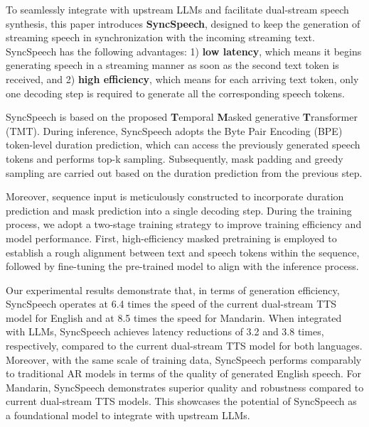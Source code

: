 To seamlessly integrate with  upstream LLMs and facilitate dual-stream speech synthesis, this paper introduces \textbf{SyncSpeech}, designed to keep the generation of streaming speech in synchronization with the incoming streaming text. SyncSpeech has the following advantages: 1) \textbf{low latency}, which means it begins generating speech in a streaming manner as soon as the second text token is received,
and
2) \textbf{high efficiency}, 
which means for each arriving text token, only one decoding step is required to generate all the corresponding speech tokens.

SyncSpeech is based on the proposed \textbf{T}emporal \textbf{M}asked generative \textbf{T}ransformer (TMT).
During inference, SyncSpeech adopts the Byte Pair Encoding (BPE) token-level duration prediction, which can access the previously generated speech tokens and performs top-k sampling. 
Subsequently, mask padding and greedy sampling are carried out based on  the duration prediction from the previous step. 

Moreover, sequence input is meticulously constructed to incorporate duration prediction and mask prediction into a single decoding step.
During the training process, we adopt a two-stage training strategy to improve training efficiency and model performance. First, high-efficiency masked pretraining is employed to establish a rough alignment between text and speech tokens within the sequence, followed by fine-tuning the pre-trained model to align with the inference process.

Our experimental results demonstrate that, in terms of generation efficiency, SyncSpeech operates at 6.4 times the speed of the current dual-stream TTS model for English and at 8.5 times the speed for Mandarin. When integrated with LLMs, SyncSpeech achieves latency reductions of 3.2 and 3.8 times, respectively, compared to the current dual-stream TTS model for both languages.
Moreover, with the same scale of training data, SyncSpeech performs comparably to traditional AR models in terms of the quality of generated English speech. For Mandarin, SyncSpeech demonstrates superior quality and robustness compared to current dual-stream TTS models. This showcases the potential of  SyncSpeech as a foundational model to integrate with upstream LLMs.

